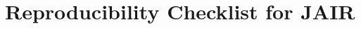 \documentclass[review]{jair}
\begin{document}

\appendix
\section{Reproducibility Checklist for JAIR}
\end{document}
